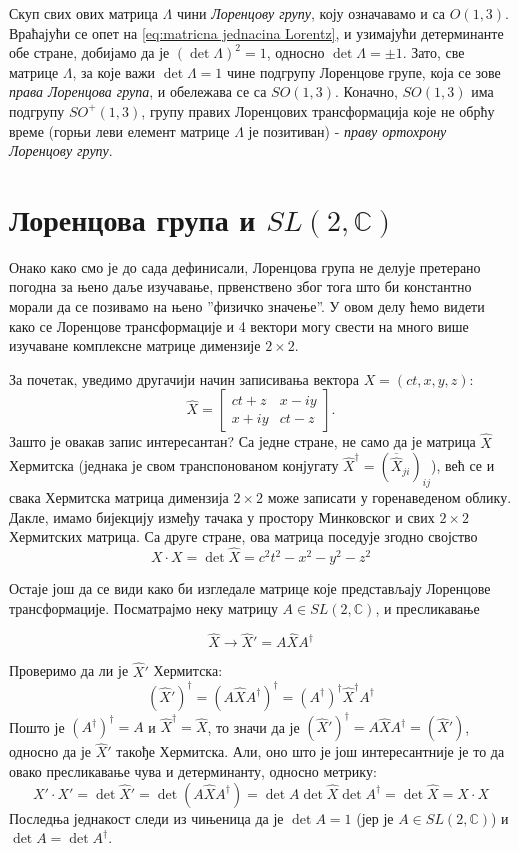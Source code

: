 \documentclass{report}
\theoremstyle{plain}
\theoremstyle{definition}
\begin{document}
Скуп свих ових матрица $\Lambda$ чини \emph{Лоренцову групу}, коју означавамо и са $O(1, 3)$. Враћајући се опет на \eqref{eq:matricna jednacina Lorentz}, и узимајући детерминанте обе стране, добијамо да је $(\det\Lambda)^2 = 1$, односно $\det\Lambda = \pm 1$. Зато, све матрице $\Lambda$, за које важи $\det\Lambda = 1$ чине подгрупу Лоренцове групе, која се зове \emph{права Лоренцова група}, и обележава се са $SO(1, 3)$. Коначно, $SO(1, 3)$ има подгрупу $SO^+(1, 3)$, групу правих Лоренцових трансформација које не обрћу време (горњи леви елемент матрице $\Lambda$ је позитиван) - \emph{праву ортохрону Лоренцову групу}.

\section{Лоренцова група и $SL(2, \mathbb{C})$}
Онако како смо је до сада дефинисали, Лоренцова група не делује претерано погодна за њено даље изучавање, првенствено због тога што би константно морали да се позивамо на њено ''физичко значење''. У овом делу ћемо видети како се Лоренцове трансформације и 4 вектори могу свести на много више изучаване комплексне матрице димензије $2\times 2$.

За почетак, уведимо другачији начин записивања вектора $X = (ct, x, y, z)$:
$$\hat X = \begin{bmatrix}
            ct+z & x-iy \\
            x+iy & ct-z
           \end{bmatrix}.$$
Зашто је овакав запис интересантан? Са једне стране, не само да је матрица $\hat X$ Хермитска (једнака је свом транспонованом конјугату ${\hat X}^\dag = (\overline{\hat X}_{ji})_{ij}$), већ се и свака Хермитска матрица димензија $2\times 2$ може записати у горенаведеном облику. Дакле, имамо бијекцију између тачака у простору Минковског и свих $2\times 2$ Хермитских матрица. Са друге стране, ова матрица поседује згодно својство
$$X \cdot X = \det \hat X = c^2 t^2 - x^2 - y^2 - z^2$$

Остаје још да се види како би изгледале матрице које представљају Лоренцове трансформације. Посматрајмо неку матрицу $A\in SL(2, \mathbb{C})$, и пресликавање

\begin{equation}
\label{eq:spinor map1}
\hat X \to \hat X' = A\hat X A^\dag \tag{\maltese}
\end{equation}

Проверимо да ли је $\hat X'$ Хермитска:
$$(\hat X')^\dag = (A\hat X A^\dag)^\dag = (A^\dag)^\dag {\hat X}^\dag A^\dag$$
Пошто је $(A^\dag)^\dag = A$ и ${\hat X}^\dag = \hat X$, то значи да је $(\hat X')^\dag = A\hat X A^\dag = (\hat X')$, односно да је $\hat X'$ такође Хермитска. Али, оно што је још интересантније је то да овако пресликавање чува и детерминанту, односно метрику:
$$X'\cdot X' = \det \hat X' = \det(A\hat X A^\dag) = \det A \det \hat X \det A^\dag = \det \hat X = X\cdot X$$
Последња једнакост следи из чињеница да је $\det A = 1$ (јер је $A\in SL(2, \mathbb{C})$) и $\det A = \det A^\dag$.
\end{document}
